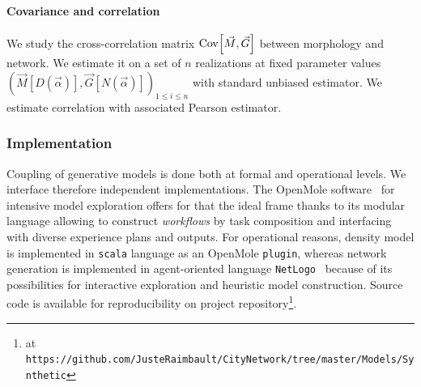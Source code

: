 

\paragraph{Covariance and correlation}

We study the cross-correlation matrix $\operatorname{Cov}\!\left[\vec{M},\vec{G}\right]$ between morphology and network. We estimate it on a set of $n$ realizations at fixed parameter values $(\vec{M}\left[D(\vec{\alpha})\right],\vec{G}\left[N(\vec{\alpha})\right])_{1\leq i\leq n}$ with standard unbiased estimator. We estimate correlation with associated Pearson estimator. 



\subsubsection{Implementation}


Coupling of generative models is done both at formal and operational levels. We interface therefore independent implementations. The OpenMole software~\cite{reuillon2013openmole} for intensive model exploration offers for that the ideal frame thanks to its modular language allowing to construct \emph{workflows} by task composition and interfacing with diverse experience plans and outputs. For operational reasons, density model is implemented in \texttt{scala} language as an OpenMole \texttt{plugin}, whereas network generation is implemented in agent-oriented language \texttt{NetLogo}~\cite{wilensky1999netlogo} because of its possibilities for interactive exploration and heuristic model construction. Source code is available for reproducibility on project repository\footnote{at \texttt{https://github.com/JusteRaimbault/CityNetwork/tree/master/Models/Synthetic}}.


